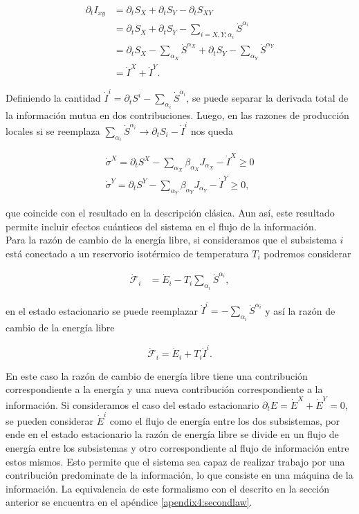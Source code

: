 \begin{align*}
    \partial_{t}I_{xy} & = \partial_{t}S_{X} + \partial_{t}S_{Y} - \partial_{t}S_{XY} \\
        & = \partial_{t}S_{X} + \partial_{t}S_{Y} - \sum_{i=X,Y;\alpha_{i}}\dot{S}^{\alpha_{i}} \\
        & =  \partial_{t}S_{X} - \sum_{\alpha_{X}} \dot{S}^{\alpha_{X}} + \partial_{t}S_{Y} - \sum_{\alpha_{Y}} \dot{S}^{\alpha_{Y}} \\
        & = \dot{I}^{X} + \dot{I}^{Y}.
\end{align*}

Definiendo la cantidad $\dot{I}^{i} = \partial_{t}S^{i} - \sum_{\alpha_{i}} \dot{S}^{\alpha_{i}} $, se puede separar la derivada total de la información mutua en dos contribuciones. Luego, en las razones de producción locales si se reemplaza $\sum_{\alpha_{i}}\dot{S}^{\alpha_{i}} \to \partial_{t}S_{i} - \dot{I}^{i} $ nos queda 

\begin{align*}
    \dot{\sigma}^{X} = \partial_{t}S^{X} - \sum_{\alpha_{X}} \beta_{\alpha_{X}} J_{\alpha_{X}} - \dot{I}^{X} \geq 0 \\
    \dot{\sigma}^{Y} = \partial_{t}S^{Y} - \sum_{\alpha_{Y}} \beta_{\alpha_{Y}} J_{\alpha_{Y}} - \dot{I}^{Y} \geq 0,
\end{align*}

que coincide con el resultado en la descripción clásica. Aun así, este resultado permite incluir efectos cuánticos del sistema en el flujo de la información.\\
Para la razón de cambio de la energía libre, si consideramos que el subsistema $i$ está conectado a un reservorio isotérmico de temperatura $T_{i}$ podremos considerar

\begin{align*}
    \dot{\mathcal{F}}_{i} & = \dot{E}_{i} - T_{i} \sum_{\alpha_{i}}\dot{S}^{\alpha_{i}}, 
\end{align*}

en el estado estacionario se puede reemplazar $\dot{I}^{i} = - \sum_{\alpha_{i}}\dot{S}^{\alpha_{i}}$ y así la razón de cambio de la energía libre
\label{sec4:flujos0}

\begin{equation*}
    \dot{\mathcal{F}}_{i} = \dot{E}_{i} + T_{i} \dot{I}^{i}.
\end{equation*}

En este caso la razón de cambio de energía libre tiene una contribución correspondiente a la energía y una nueva contribución correspondiente a la información. Si consideramos el caso del estado estacionario $\partial_{t}E = \dot{E}^{X} + \dot{E}^{Y} = 0$, se pueden considerar $\dot{E}^{i}$ como el flujo de energía entre los dos subsistemas, por ende en el estado estacionario la razón de energía libre se divide en un flujo de energía entre los subsistemas y otro correspondiente al flujo de información entre estos mismos. Esto permite que el sistema sea capaz de realizar trabajo por una contribución predominate de la información, lo que consiste en una máquina de la información. La equivalencia de este formalismo con el descrito en la sección anterior se encuentra en el apéndice \ref{apendix4:secondlaw}.


